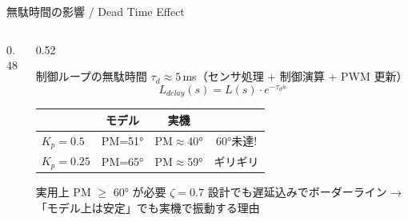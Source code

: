 \documentclass[aspectratio=169, 14pt]{beamer}
\begin{document}
\begin{frame}{無駄時間の影響 / Dead Time Effect}
  \begin{columns}[c]
    \begin{column}{0.48\textwidth}
      \centering
      \resizebox{\columnwidth}{!}{}
    \end{column}
    \begin{column}{0.52\textwidth}
      \begin{block}{制御ループの無駄時間}\small
        $\tau_d \approx 5$\,ms（センサ処理 + 制御演算 + PWM 更新）
        \vspace{-0.3em}
        \[
          L_{delay}(s) = L(s) \cdot e^{-\tau_d s}
        \]
        \vspace{-1.5em}
      \end{block}

      \vspace{0.2em}

      {\small
      \begin{tabular}{lccc}
        \hline
        & \textbf{モデル} & \textbf{実機} & \\
        \hline
        $K_p\!=\!0.5$  & PM=51° & PM$\approx$40° & {\color{red}60°未達!} \\
        $K_p\!=\!0.25$ & PM=65° & PM$\approx$59° & ギリギリ \\
        \hline
      \end{tabular}}

      \vspace{0.5em}

      \begin{alertblock}{\small 実用上 PM $\geq$ 60° が必要}\scriptsize
        $\zeta\!=\!0.7$ 設計でも遅延込みでボーダーライン
        → 「モデル上は安定」でも実機で振動する理由
      \end{alertblock}
    \end{column}
  \end{columns}
\end{frame}
\end{document}
